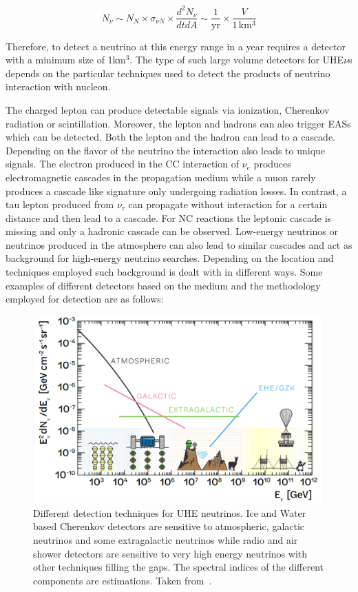 \begin{equation}
  N_{\nu} \sim N_N \times \sigma_{\nu N} \times \frac{d^2N_{\nu}}{dt dA} \sim \frac{1}{\text{yr}} \times \frac{V}{1\,\mathrm{km^3}}
\end{equation}

Therefore, to detect a neutrino at this energy range in a year requires a detector with a minimum size of 1km$^3$. The type of such large volume detectors for UHE$\nu$s depends on the particular techniques used to detect the products of neutrino interaction with nucleon. 

The charged lepton can produce detectable signals via ionization, Cherenkov radiation or scintillation. Moreover, the lepton and hadrons can also trigger EASs which can be detected. Both the lepton and the hadron can lead to a cascade. Depending on the flavor of the neutrino the interaction also leads to unique signals. The electron produced in the CC interaction of $\nu_e$ produces electromagnetic cascades in the propagation medium while a muon rarely produces a cascade like signature only undergoing radiation losses. In contrast, a tau lepton produced from $\nu_{\tau}$ can propagate without interaction for a certain distance and then lead to a cascade. For NC reactions the leptonic cascade is missing and only a hadronic cascade can be observed. Low-energy neutrinos or neutrinos produced in the atmosphere can also lead to similar cascades and act as background for high-energy neutrino searches. Depending on the location and techniques employed such background is dealt with in different ways. Some examples of different detectors based on the medium and the methodology employed for detection are as follows:

\begin{figure}[t!]
  \centering
  \includegraphics[width=14.5cm]{thesis_figures/CRnNu/UHE_nu_techniques.pdf}
  \caption{Different detection techniques for UHE neutrinos. Ice and Water based Cherenkov detectors are sensitive to atmospheric, galactic neutrinos and some extragalactic neutrinos while radio and air shower detectors are sensitive to very high energy neutrinos with other techniques filling the gaps. The spectral indices of the different components are estimations. Taken from~\cite{Arguelles:2024xkx}.}
  \label{fig:UHE-nu-techniques}
\end{figure}

